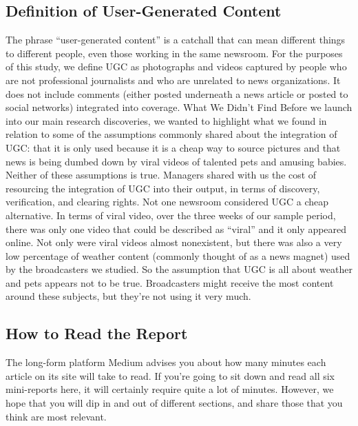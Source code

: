 \begin{enumerate}
\chapter{Definition of User-Generated Content}
The phrase ``user-generated content'' is a catchall that can mean different
things to different people, even those working in the same newsroom. For
the purposes of this study, we define UGC as photographs and videos captured
by people who are not professional journalists and who are unrelated
to news organizations. It does not include comments (either posted underneath
a news article or posted to social networks) integrated into coverage.
What We Didn't Find
Before we launch into our main research discoveries, we wanted to highlight
what we found in relation to some of the assumptions commonly shared
about the integration of UGC: that it is only used because it is a cheap way
to source pictures and that news is being dumbed down by viral videos of
talented pets and amusing babies.
Neither of these assumptions is true. Managers shared with us the cost of
resourcing the integration of UGC into their output, in terms of discovery,
verification, and clearing rights. Not one newsroom considered UGC a
cheap alternative.
In terms of viral video, over the three weeks of our sample period, there
was only one video that could be described as ``viral'' and it only appeared
online. Not only were viral videos almost nonexistent, but there was also a
very low percentage of weather content (commonly thought of as a news
magnet) used by the broadcasters we studied. So the assumption that UGC
is all about weather and pets appears not to be true. Broadcasters might
receive the most content around these subjects, but they're not using it
very much.

\section{How to Read the Report}
The long-form platform Medium advises you about how many minutes each
article on its site will take to read. If you're going to sit down and read all six
mini-reports here, it will certainly require quite a lot of minutes. However,
we hope that you will dip in and out of different sections, and share those
that you think are most relevant.


\end{enumerate}
